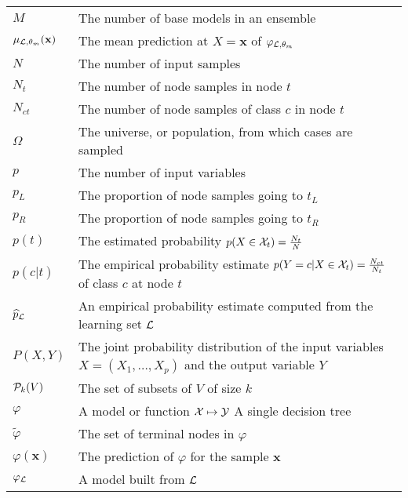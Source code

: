 \begin{tabularx}{\textwidth}{ l X }
$M$ & The number of base models in an ensemble \dotfill  \pageref{ntn:M}\\
$\mu_{{\cal L},\theta_m}(\mathbf{x})$ & The mean prediction at $X = \mathbf{x}$ of $\varphi_{{\cal L},\theta_m}$ \dotfill \pageref{eqn:4:mu} \\
$N$ & The number of input samples \dotfill  \pageref{ntn:N}\\
$N_t$ & The number of node samples in node $t$ \dotfill  \pageref{ntn:N_t}\\
$N_{ct}$ & The number of node samples of class $c$ in node $t$ \dotfill  \pageref{ntn:N_ct}\\
$\Omega$ & The universe, or population, from which cases are sampled \dotfill  \pageref{ntn:omega}\\
$p$ & The number of input variables \dotfill  \pageref{ntn:p}\\
$p_L$ & The proportion of node samples going to $t_L$ \dotfill  \pageref{ntn:p_L}\\
$p_R$ & The proportion of node samples going to $t_R$ \dotfill  \pageref{ntn:p_R}\\
$p(t)$ & The estimated probability $p(X \in {\cal X}_t)=\tfrac{N_t}{N}$ \dotfill  \pageref{ntn:p_t}\\
$p(c|t)$ & The empirical probability estimate $p(Y=c | X \in {\cal X}_t)=\tfrac{N_{ct}}{N_t}$ of class $c$ at node $t$ \dotfill  \pageref{ntn:p_ct}\\
$\widehat{p}_{\cal L}$ & An empirical probability estimate computed from the learning set ${\cal L}$\dotfill  \pageref{eqn:4:proba-estimates}\\
$P(X,Y)$ & The joint probability distribution of the input variables $X=(X_1,\dots,X_p)$ and the output variable $Y$ \dotfill  \pageref{ntn:P_XY}\\
${\cal P}_k(V)$ & The set of subsets of $V$ of size $k$ \dotfill  \pageref{ntn:P_k}\\
$\varphi$ & A model or function ${\cal X} \mapsto {\cal Y}$ \dotfill  \pageref{ntn:varphi}\newline A single decision tree \dotfill  \pageref{ntn:tree}\\
$\widetilde{\varphi}$ & The set of terminal nodes in $\varphi$ \dotfill  \pageref{ntn:varphi-leafs}\\
$\varphi(\mathbf{x})$ & The prediction of $\varphi$ for the sample $\mathbf{x}$ \dotfill  \pageref{ntn:varphi-x}\\
$\varphi_{\cal L}$ & A model built from ${\cal L}$ \dotfill  \pageref{ntn:varphi-L}\\

\end{tabularx}
